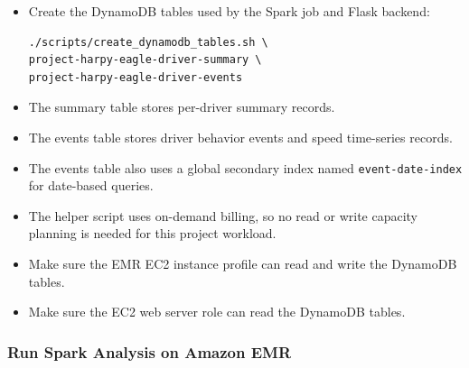\documentclass[12pt,a4paper]{article}
\begin{document}
\begin{itemize}
    \item Create the DynamoDB tables used by the Spark job and Flask backend:
\begin{lstlisting}
./scripts/create_dynamodb_tables.sh \
project-harpy-eagle-driver-summary \
project-harpy-eagle-driver-events
\end{lstlisting}

    \item The summary table stores per-driver summary records.
    \item The events table stores driver behavior events and speed time-series records.
    \item The events table also uses a global secondary index named \texttt{event-date-index} for date-based queries.
    \item The helper script uses on-demand billing, so no read or write capacity planning is needed for this project workload.
    \item Make sure the EMR EC2 instance profile can read and write the DynamoDB tables.
    \item Make sure the EC2 web server role can read the DynamoDB tables.
\end{itemize}

\subsubsection{Run Spark Analysis on Amazon EMR}
\end{document}
